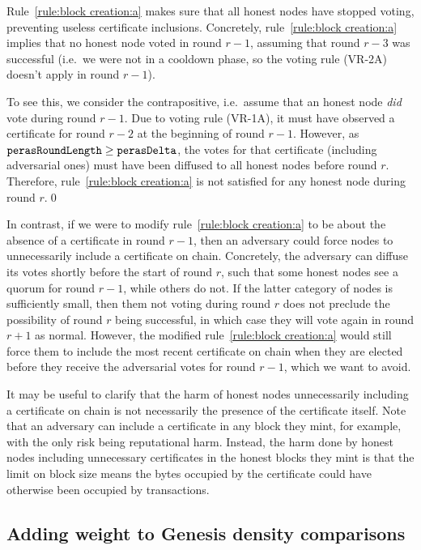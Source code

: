 Rule~\ref{rule:block creation:a} makes sure that all honest nodes have stopped voting, preventing useless certificate inclusions.
Concretely, rule~\ref{rule:block creation:a} implies that no honest node voted in round $r-1$, assuming that round $r-3$ was successful (i.e.\ we were not in a cooldown phase, so the voting rule (VR-2A) doesn't apply in round $r-1$).

To see this, we consider the contrapositive, i.e.\ assume that an honest node \emph{did} vote during round $r-1$.
Due to voting rule (VR-1A), it must have observed a certificate for round $r-2$ at the beginning of round $r-1$.
However, as $\mathtt{perasRoundLength}\ge\mathtt{perasDelta}$, the votes for that certificate (including adversarial ones) must have been diffused to all honest nodes before round $r$.
Therefore, rule~\ref{rule:block creation:a} is not satisfied for any honest node during round $r$.\qed{}

In contrast, if we were to modify rule~\ref{rule:block creation:a} to be about the absence of a certificate in round $r-1$, then an adversary could force nodes to unnecessarily include a certificate on chain.
Concretely, the adversary can diffuse its votes shortly before the start of round $r$, such that some honest nodes see a quorum for round $r-1$, while others do not.
If the latter category of nodes is sufficiently small, then them not voting during round $r$ does not preclude the possibility of round $r$ being successful, in which case they will vote again in round $r + 1$ as normal.
However, the modified rule~\ref{rule:block creation:a} would still force them to include the most recent certificate on chain when they are elected before they receive the adversarial votes for round $r-1$, which we want to avoid.

It may be useful to clarify that the harm of honest nodes unnecessarily including a certificate on chain is not necessarily the presence of the certificate itself.
Note that an adversary can include a certificate in any block they mint, for example, with the only risk being reputational harm.
Instead, the harm done by honest nodes including unnecessary certificates in the honest blocks they mint is that the limit on block size means the bytes occupied by the certificate could have otherwise been occupied by transactions.

\subsection{Adding weight to Genesis density comparisons}\label{sec:weighted genesis}

